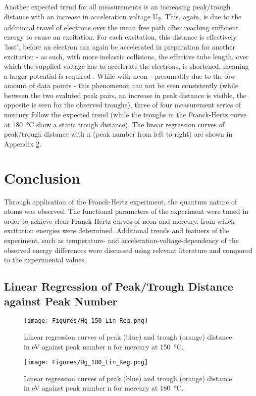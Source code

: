 \documentclass[titlepage]{article}
\begin{document}
Another expected trend for all measurements is an increasing peak/trough distance with an increase in acceleration voltage U\textsubscript{2}. This, again, is due to the additional travel of electrons over the mean free path after reaching sufficient energy to cause an excitation. For each excitation, this distance is effectively 'lost', before an electron can again be accelerated in preparation for another excitation - as such, with more inelastic collisions, the effective tube length, over which the supplied voltage has to accelerate the electrons, is shortened, meaning a larger potential is required \autocite{New_Features_of_FH_Exp}. While with neon - presumably due to the low amount of data points - this phenomenon can not be seen consistently (while between the two evaluted peak pairs, an increase in peak distance is visible, the opposite is seen for the observed troughs), three of four measurement series of mercury follow the expected trend (while the troughs in the Franck-Hertz curve at 180~°C show a static trough distance). The linear regression curves of peak/trough distance with n (peak number from left to right) are shown in Appendix \ref{sec_apx_lin_reg}.

\section{Conclusion}
Through application of the Franck-Hertz experiment, the quantum nature of atoms was observed. The functional parameters of the experiment were tuned in order to achieve clear Franck-Hertz curves of neon and mercury, from which excitation energies were determined. Additional trends and featuers of the experiment, such as temperature- and acceleration-voltage-dependency of the observed energy differences were discussed using relevant literature and compared to the experimental values.

\newpage
\printbibliography

\newpage
\begin{appendices}
\section{Linear Regression of Peak/Trough Distance against Peak Number} \label{sec_apx_lin_reg}
\begin{figure}[H]
    \centering
    \texttt{[image: Figures/Hg\_150\_Lin\_Reg.png]}
    \caption{Linear regression curves of peak (blue) and trough (orange) distance in eV against peak number n for mercury at 150~°C.}
    \label{fig_hg_150_Lin_Reg}
\end{figure}
%
\begin{figure}[H]
    \centering
    \texttt{[image: Figures/Hg\_180\_Lin\_Reg.png]}
    \caption{Linear regression curves of peak (blue) and trough (orange) distance in eV against peak number n for mercury at 180~°C.}
    \label{fig_hg_180_Lin_Reg}
\end{figure}
\end{appendices}
\end{document}
